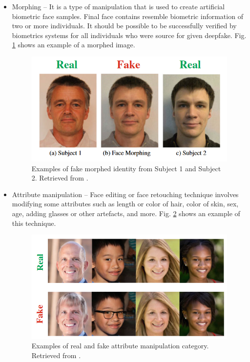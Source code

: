 \begin{itemize}
\item Morphing – It is a type of manipulation that is used to create artificial biometric face samples. Final face contains resemble biometric information of two or more individuals. It should be possible to be successfully verified by biometrics systems for all individuals who were source for given deepfake. Fig. \ref{fig:morphing} shows an example of a morphed image.
\begin{figure}[H]
    \centering
    \includegraphics[width=.45\linewidth]{other-fig/morphing.png}        
    \caption{Examples of fake morphed identity from Subject 1 and Subject 2. Retrieved from \cite{IntroductionToDigitalFaceManipulation}.}
\label{fig:morphing}
\end{figure}

\item Attribute manipulation – Face editing or face retouching technique involves modifying some attributes such as length or color of hair, color of skin, sex, age, adding glasses or other artefacts, and more. Fig. \ref{fig:attribute_manipulation} shows an example of this technique.
\begin{figure}[H]
    \centering
    \includegraphics[width=.52\linewidth]{other-fig/attribute_manipulation.png}        
    \caption{Examples of real and fake attribute manipulation category. Retrieved from \cite{IntroductionToDigitalFaceManipulation}.}
\label{fig:attribute_manipulation}
\end{figure}


\end{itemize}
